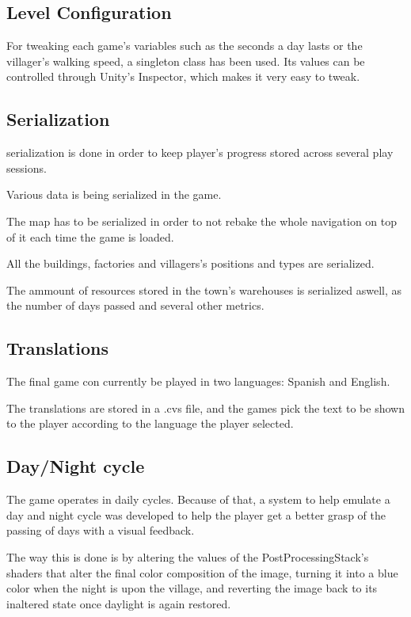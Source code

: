 \subsection{Level Configuration}

For tweaking each game's variables such as the seconds a day lasts
or the villager's walking speed,
a \gls{singleton} class has been used. Its values can be controlled
through Unity's Inspector, which makes it very easy to tweak.

\subsection{Serialization}

\Gls{serialization}
is done in order to keep player's progress stored across several play sessions.

Various data is being serialized in the game.

The map has to be serialized in order to not rebake the whole navigation
on top of it each time the game is loaded.

All the buildings, factories and villagers's positions and types are
serialized.

The ammount of resources stored in the town's warehouses is serialized 
aswell, as the number of days passed and several other metrics.

\subsection{Translations}

The final game con currently be played in two languages: Spanish and English.

The translations are stored in a .cvs file, and the games pick the text
to be shown to the player according to the language the player selected.

\subsection{Day/Night cycle}

The game operates in daily cycles. Because of that, a system to help emulate
a day and night cycle was developed to help the player get a better
grasp of the passing of days with a visual feedback.

The way this is done is by altering the values of the PostProcessingStack's
shaders that alter the final color composition of the image, turning it into
a blue color when the night is upon the village, and reverting
the image back to its inaltered state once daylight is again restored.

